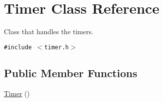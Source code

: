 \hypertarget{class_timer}{
\section{Timer Class Reference}
\label{class_timer}
}
Class that handles the timers.  


{\tt \#include $<$timer.h$>$}

\subsection*{Public Member Functions}
\begin{CompactItemize}
\item 
\hypertarget{class_timer_5f16e8da27d2a5a5242dead46de05d97}{
\hyperlink{class_timer_5f16e8da27d2a5a5242dead46de05d97}{Timer} ()}
\label{class_timer_5f16e8da27d2a5a5242dead46de05d97}


\end{CompactItemize}
